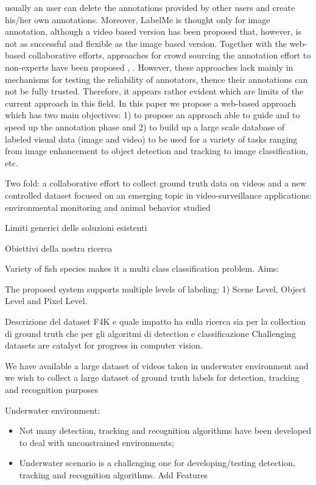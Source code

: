 usually an user can delete the annotations provided by other users and create his/her own annotations. Moreover, LabelMe is thought only for image annotation, although a video based version has been proposed that, however, is not as successful and flexible as the image based version.
Together with the web-based collaborative efforts, approaches for crowd sourcing the annotation effort to non-experts have been proposed \cite{}, \cite{}. However, these approaches lack mainly in mechanisms for testing the reliability of annotators, thence their annotations can not be fully trusted. Therefore, it appears rather evident which are limits of the current approach in this field. 
In this paper we propose a web-based approach which has two main objectives: 1) to propose an approach able to guide and to speed up the annotation phase and 2) to build up a large scale database of labeled visual data (image and video) to be used for a variety of tasks ranging from image enhancement to object detection and tracking to image classification, etc.


Two fold: a collaborative effort to collect ground truth data on videos and a new controlled dataset focused on an emerging topic in video-surveillance applications: environmental monitoring and animal behavior studied


\item Limiti generici delle soluzioni esistenti
\item Obiettivi della nostra ricerca

Variety of fish species makes it a multi class classification problem.
Aims:

The proposed system supports multiple levels of labeling: 1) Scene Level, Object Level and Pixel Level.


\item Descrizione del dataset F4K e quale impatto ha sulla ricerca sia per la collection di ground truth che per gli algoritmi di detection e classificazione
Challenging datasets are catalyst for progress in computer vision.

We have available a large dataset of videos taken in underwater environment and we wish to collect a large dataset of ground truth labels for detection, tracking and recognition purposes


Underwater environment:
\begin{itemize}
\item Not many detection, tracking and recognition algorithms have been developed to deal with unconstrained environments;
\item Underwater scenario is a challenging one for developing/testing detection, tracking and recognition algorithms. Add Features  
\end{itemize}


